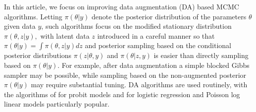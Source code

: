 \documentclass[10pt]{article}
\begin{document}
In this article, we focus on improving data augmentation (DA) based MCMC algorithms.  Letting $\pi( \theta | y )$ denote the posterior distribution of the parameters $\theta$ given data $y$, such algorithms focus on the modified stationary distribution $\pi( \theta, z | y ),$ with latent data $z$ introduced in a careful manner so that $\pi( \theta | y) = \int \pi( \theta, z | y ) dz$ and posterior sampling based on the conditional posterior distributions $\pi(z | \theta, y)$ and $\pi( \theta | z, y)$ is easier than directly sampling based on $\pi( \theta | y)$.   For example, after data augmentation a simple blocked Gibbs sampler may be possible, while sampling based on the non-augmented posterior $\pi( \theta |y)$ may require substantial tuning.  DA algorithms are used routinely, with the algorithms of \cite{albert1993bayesian} for probit models and \cite{polson2013bayesian} for logistic regression and Poisson log linear models particularly popular.  

\end{document}
